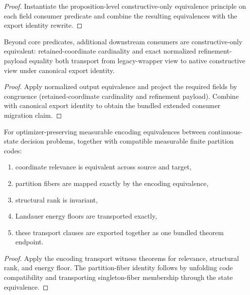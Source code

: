 \begin{proof}
Instantiate the proposition-level constructive-only equivalence principle on each field consumer predicate and combine the resulting equivalences with the export identity rewrite.
\end{proof}

\begin{theorem}\label{thm:constructive-only-extended-field-consumers}
Beyond core predicates, additional downstream consumers are constructive-only equivalent: retained-coordinate cardinality and exact normalized refinement-payload equality both transport from legacy-wrapper view to native constructive view under canonical export identity.
\end{theorem}

\begin{proof}
Apply normalized output equivalence and project the required fields by congruence (retained-coordinate cardinality and refinement payload). Combine with canonical export identity to obtain the bundled extended consumer migration claim.
\end{proof}

\begin{theorem}\label{thm:continuous-state-measurable-encoding-transport}
For optimizer-preserving measurable encoding equivalences between continuous-state decision problems, together with compatible measurable finite partition codes:
\begin{enumerate}
\item coordinate relevance is equivalent across source and target,
\item partition fibers are mapped exactly by the encoding equivalence,
\item structural rank is invariant,
\item Landauer energy floors are transported exactly,
\item these transport clauses are exported together as one bundled theorem endpoint.
\end{enumerate}
\end{theorem}

\begin{proof}
Apply the encoding transport witness theorems for relevance, structural rank, and energy floor. The partition-fiber identity follows by unfolding code compatibility and transporting singleton-fiber membership through the state equivalence.
\end{proof}

